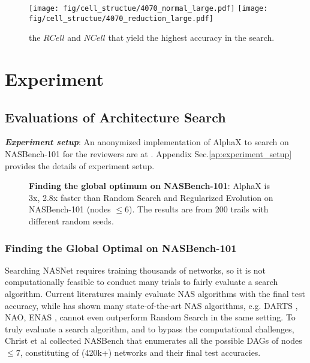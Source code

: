 \documentclass[10pt,twocolumn,letterpaper]{article}
\begin{document}
\begin{figure}
  \begin{center}
    \texttt{[image: fig/cell\_structue/4070\_normal\_large.pdf]}
    \texttt{[image: fig/cell\_structue/4070\_reduction\_large.pdf]}
  \end{center}
  \caption{the $RCell$ and $NCell$ that yield the highest accuracy in the search.}
  \label{best-arch}
\end{figure}

\section{Experiment}


\subsection{Evaluations of Architecture Search}
\textit{\textbf{Experiment setup}}:  An anonymized implementation of AlphaX to search on NASBench-101 for the reviewers are at \cite{alphax-implementation}. Appendix Sec.\ref{ap:experiment_setup} provides the details of experiment setup.

  \begin{figure}[t]
    \begin{center}
         \quad
    \end{center}
    \caption{\textbf{Finding the global optimum on NASBench-101}: AlphaX is 3x, 2.8x faster than Random Search and Regularized Evolution on NASBench-101 (nodes $\leq 6$). The results are from 200 trails with different random seeds. }
    \label{fig:nasbench-results}
  \end{figure}

\subsubsection{ Finding the Global Optimal on NASBench-101 }
Searching NASNet requires training thousands of networks, so it is not computationally feasible to conduct many trials to fairly evaluate a search algorithm. Current literatures mainly evaluate NAS algorithms with the final test accuracy, while \cite{sciuto2019evaluating} has shown many state-of-the-art NAS algorithms, e.g. DARTS \cite{liu2018darts}, NAO\cite{luo2018neural}, ENAS \cite{pham2018efficient}, cannot even outperform Random Search in the same setting. To truly evaluate a search algorithm, and to bypass the computational challenges, Christ et al collected NASBench \cite{ying2019bench} that enumerates all the possible DAGs of nodes $\leq7$, constituting of (420k+) networks and their final test accuracies.
\end{document}
